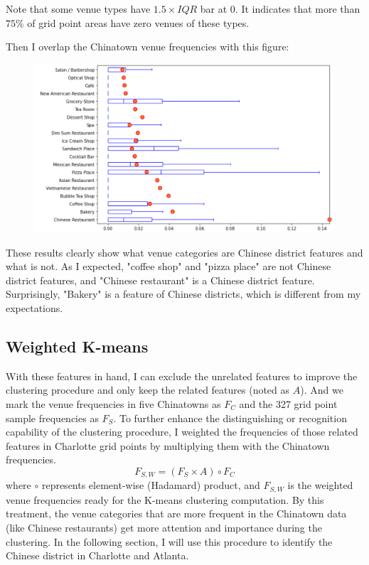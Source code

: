 \documentclass{article}
\begin{document}
Note that some venue types have $1.5 \times IQR$ bar at 0. It indicates that more than $75\%$ of grid point areas have zero venues of these types.

\newpage

Then I overlap the Chinatown venue frequencies with this figure:
\begin{figure}[h!]
\includegraphics[width=1.0\textwidth]{cn3.pdf}
\centering
\end{figure}

These results clearly show what venue categories are Chinese district features and what is not.
As I expected, "coffee shop" and "pizza place" are not Chinese district features, and "Chinese restaurant" is a Chinese district feature.
Surprisingly, "Bakery" is a feature of Chinese districts, which is different from my expectations.

\subsection{Weighted K-means}

With these features in hand, I can exclude the unrelated features to improve the clustering procedure and only keep the related features (noted as $A$).
And we mark the venue frequencies in five Chinatowns as $F_C$ and the 327 grid point sample frequencies as $F_S$.
To further enhance the distinguishing or recognition capability of the clustering procedure, I weighted the frequencies of those related features in Charlotte grid points by multiplying them with the Chinatown frequencies.
$$ F_{S, W} = (F_S \times A) \circ F_C $$
where $\circ$ represents element-wise (Hadamard) product, and $F_{S, W}$ is the weighted venue frequencies ready for the K-means clustering computation.
By this treatment, the venue categories that are more frequent in the Chinatown data (like Chinese restaurants) get more attention and importance during the clustering.
In the following section, I will use this procedure to identify the Chinese district in Charlotte and Atlanta.
\end{document}
